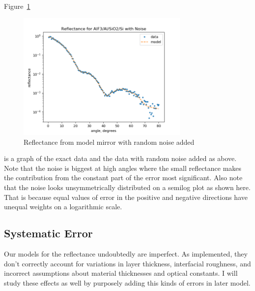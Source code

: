 \documentclass[english]{scrartcl}
\begin{document}
Figure~\ref{fig:noise}
\begin{figure}[htb]
  \begin{center}
    \includegraphics[width=0.75\textwidth]{images/noise}
  \end{center}
  \caption{\label{fig:noise}Reflectance from model mirror with random
  noise added}
\end{figure}
is a graph of the exact data and the data with
random noise added as above. Note that the noise is biggest at high
angles where the small reflectance makes the contribution from the
constant part of the error most significant. Also note that the noise
looks unsymmetrically distributed on a semilog plot as shown here.
That is because equal values of error in the positive and negative
directions have unequal weights on a logarithmic scale.

\subsection{Systematic Error}
Our models for the reflectance undoubtedly are imperfect. As implemented,
they don't correctly account for variations in layer thickness, interfacial
roughness, and incorrect assumptions about material thicknesses and
optical constants. I will study these effects as well by purposely adding
this kinds of errors in later model.
\end{document}
